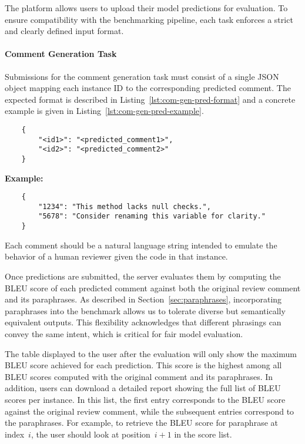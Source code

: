The platform allows users to upload their model predictions for evaluation. To ensure compatibility
with the benchmarking pipeline, each task enforces a strict and clearly defined input format.

\paragraph{Comment Generation Task}

Submissions for the comment generation task must consist of a single JSON object mapping each
instance ID to the corresponding predicted comment. The expected format is described in
Listing~\ref{lst:com-gen-pred-format} and a concrete example is given in
Listing~\ref{lst:com-gen-pred-example}.

\begin{listing}[!ht]
    \begin{verbatim}
    {
        "<id1>": "<predicted_comment1>",
        "<id2>": "<predicted_comment2>"
    }
    \end{verbatim}
    \caption{JSON format of predictions for comment generation}
    \label{lst:com-gen-pred-format}
\end{listing}



\begin{listing}[!ht]
    \textbf{Example:}
    \begin{verbatim}
    {
        "1234": "This method lacks null checks.",
        "5678": "Consider renaming this variable for clarity."
    }
    \end{verbatim}
    \caption{Example of valid comment generation submission}
    \label{lst:com-gen-pred-example}
\end{listing}

Each comment should be a natural language string intended to emulate the behavior of a human
reviewer given the code in that instance.

Once predictions are submitted, the server evaluates them by computing the BLEU score of each
predicted comment against both the original review comment and its paraphrases. As described in
Section~\ref{sec:paraphrases}, incorporating paraphrases into the benchmark allows us to tolerate
diverse but semantically equivalent outputs. This flexibility acknowledges that different phrasings
can convey the same intent, which is critical for fair model evaluation.

The table displayed to the user after the evaluation will only show the maximum BLEU score achieved
for each prediction. This score is the highest among all BLEU scores computed with the original
comment and its paraphrases. In addition, users can download a detailed report showing the full list
of BLEU scores per instance. In this list, the first entry corresponds to the BLEU score against the
original review comment, while the subsequent entries correspond to the paraphrases. For example, to
retrieve the BLEU score for paraphrase at index~$i$, the user should look at position~$i+1$ in the
score list.

